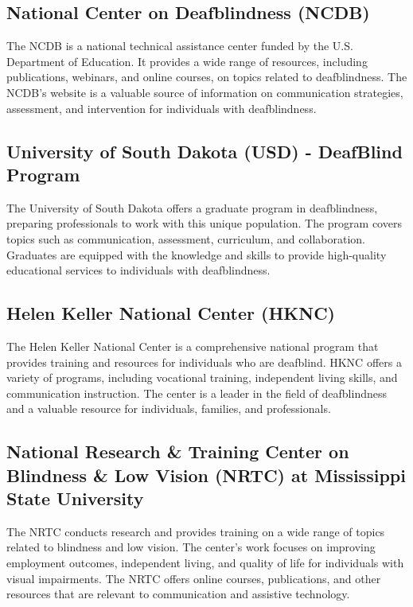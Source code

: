 \subsection{National Center on Deafblindness (NCDB)}\label{app6:ncdb}
The NCDB is a national technical assistance center funded by the U.S. Department of Education. It provides a wide range of resources, including publications, webinars, and online courses, on topics related to deafblindness. The NCDB's website is a valuable source of information on communication strategies, assessment, and intervention for individuals with deafblindness.

\subsection{University of South Dakota (USD) - DeafBlind Program}\label{app6:usd-db}
The University of South Dakota offers a graduate program in deafblindness, preparing professionals to work with this unique population. The program covers topics such as communication, assessment, curriculum, and collaboration. Graduates are equipped with the knowledge and skills to provide high-quality educational services to individuals with deafblindness.

\subsection{Helen Keller National Center (HKNC)}\label{app6:hknc}
The Helen Keller National Center is a comprehensive national program that provides training and resources for individuals who are deafblind. HKNC offers a variety of programs, including vocational training, independent living skills, and communication instruction. The center is a leader in the field of deafblindness and a valuable resource for individuals, families, and professionals.

\subsection{National Research \& Training Center on Blindness \& Low Vision (NRTC) at Mississippi State University}\label{app6:nrtc}
The NRTC conducts research and provides training on a wide range of topics related to blindness and low vision. The center's work focuses on improving employment outcomes, independent living, and quality of life for individuals with visual impairments. The NRTC offers online courses, publications, and other resources that are relevant to communication and assistive technology.

